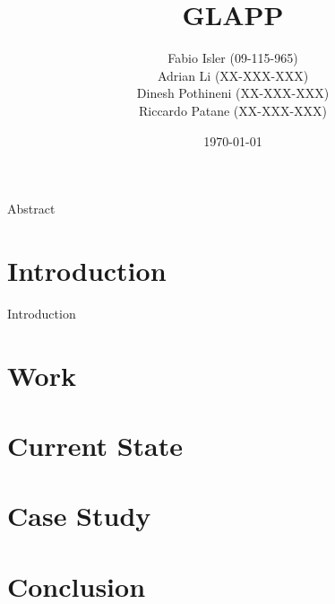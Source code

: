 \documentclass{seal_thesis}
\date{\today}
\title{GLAPP}
\subtitle{}
\author{
Fabio Isler \textmd{(09-115-965)} \\
Adrian Li \textmd{(XX-XXX-XXX)} \\
Dinesh Pothineni \textmd{(XX-XXX-XXX)} \\
Riccardo Patane \textmd{(XX-XXX-XXX)}}
\begin{document}
\maketitle

\abstract
Abstract


\chapter{Introduction}
Introduction

\chapter{Work}

\chapter{Current State}

\chapter{Case Study}

\chapter{Conclusion}



\end{document}

